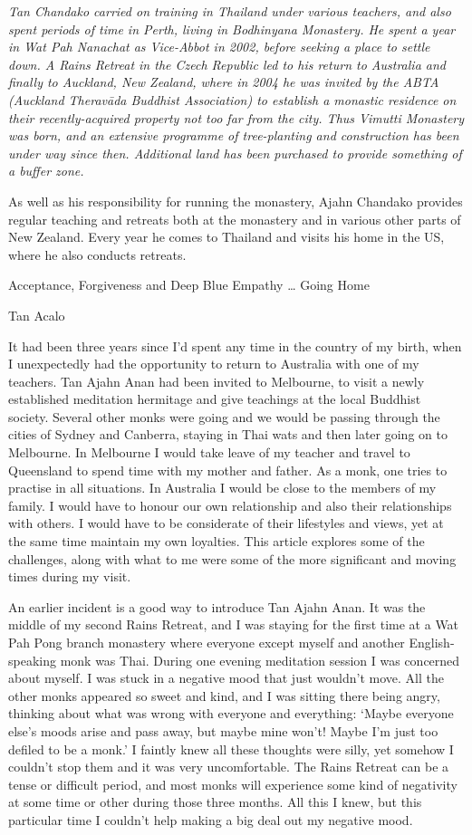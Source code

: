 \emph{Tan Chandako carried on training in Thailand under various
teachers, and also spent periods of time in Perth, living in Bodhinyana
Monastery. He spent a year in Wat Pah Nanachat as Vice-Abbot in 2002,
before seeking a place to settle down. A Rains Retreat in the Czech
Republic led to his return to Australia and finally to Auckland, New
Zealand, where in 2004 he was invited by the ABTA (Auckland Theravāda‎
Buddhist Association) to establish a monastic residence on their
recently-acquired property not too far from the city. Thus Vimutti
Monastery was born, and an extensive programme of tree-planting and
construction has been under way since then. Additional land has been
purchased to provide something of a buffer zone.}

As well as his responsibility for running the monastery, Ajahn Chandako
provides regular teaching and retreats both at the monastery and in
various other parts of New Zealand. Every year he comes to Thailand and
visits his home in the US, where he also conducts retreats.



Acceptance, Forgiveness and Deep Blue Empathy \ldots{} Going Home

Tan Acalo

It had been three years since I'd spent any time in the country of my
birth, when I unexpectedly had the opportunity to return to Australia
with one of my teachers. Tan Ajahn Anan had been invited to Melbourne,
to visit a newly established meditation hermitage and give teachings at
the local Buddhist society. Several other monks were going and we would
be passing through the cities of Sydney and Canberra, staying in Thai
wats and then later going on to Melbourne. In Melbourne I would take
leave of my teacher and travel to Queensland to spend time with my
mother and father. As a monk, one tries to practise in all situations.
In Australia I would be close to the members of my family. I would have
to honour our own relationship and also their relationships with others.
I would have to be considerate of their lifestyles and views, yet at the
same time maintain my own loyalties. This article explores some of the
challenges, along with what to me were some of the more significant and
moving times during my visit.

An earlier incident is a good way to introduce Tan Ajahn Anan. It was
the middle of my second Rains Retreat, and I was staying for the first
time at a Wat Pah Pong branch monastery where everyone except myself and
another English-speaking monk was Thai. During one evening meditation
session I was concerned about myself. I was stuck in a negative mood
that just wouldn't move. All the other monks appeared so sweet and kind,
and I was sitting there being angry, thinking about what was wrong with
everyone and everything: `Maybe everyone else's moods arise and pass
away, but maybe mine won't! Maybe I'm just too defiled to be a monk.' I
faintly knew all these thoughts were silly, yet somehow I couldn't stop
them and it was very uncomfortable. The Rains Retreat can be a tense or
difficult period, and most monks will experience some kind of negativity
at some time or other during those three months. All this I knew, but
this particular time I couldn't help making a big deal out my negative
mood.

